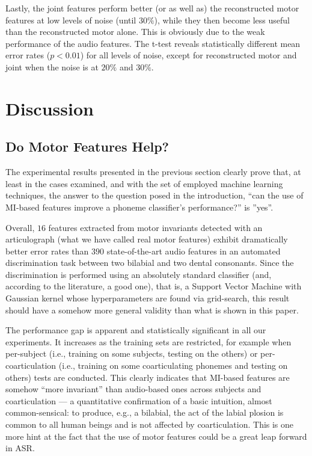 \documentclass[10pt]{article}
\begin{document}
Lastly, the joint features perform better (or as well as) the reconstructed motor features
at low levels of noise (until $30\%$), while they then become less useful than the
reconstructed motor alone. This is obviously due to the weak performance of the audio
features.
The t-test reveals statistically different mean error rates ($p<0.01$) for all levels of
noise, except for reconstructed motor and joint when the noise is at $20\%$
and $30\%$.

\section*{Discussion}
\label{sec:disc}

\subsection*{Do Motor Features Help?}

The experimental results presented in the previous section clearly prove that,
at least in the cases examined, and with the set of employed machine learning techniques,
the answer to the question posed in the introduction, ``can the use of MI-based
features improve a phoneme classifier's performance?'' is ''yes''.

Overall, $16$ features extracted from motor invariants detected with an articulograph
(what we have called real motor features) exhibit dramatically better error rates
than $390$ state-of-the-art audio features in an automated discrimination task between
two bilabial and two dental consonants. Since the discrimination is performed using an
absolutely standard classifier (and, according to the literature, a good one), that is,
a Support Vector Machine with Gaussian kernel whose hyperparameters are found via
grid-search, this result should have a somehow more general validity than what is shown
in this paper.

The performance gap is apparent and statistically significant in all our experiments.
It increases as the training sets are restricted, for example
when per-subject (i.e., training on some subjects, testing on the others) or
per-coarticulation (i.e., training on some coarticulating phonemes and testing on
others) tests are conducted. This clearly indicates that MI-based features are
somehow ``more invariant'' than audio-based ones across subjects and
coarticulation --- a quantitative confirmation of a basic
intuition, almost common-sensical: to produce, e.g., a bilabial, the act of
the labial plosion is common to all human beings and is not affected by
coarticulation. This is one more hint at the fact that the use of motor features
could be a great leap forward in ASR.
\end{document}
